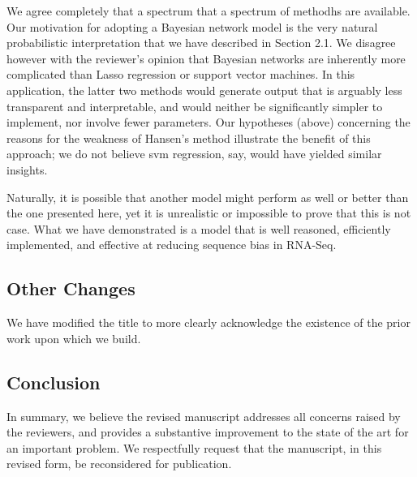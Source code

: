 \documentclass{article}
\begin{document}
We agree completely that a spectrum that a spectrum of methodhs are available.
Our motivation for adopting a Bayesian network model is the very natural
probabilistic interpretation that we have described in Section 2.1. We disagree
however with the reviewer's opinion that Bayesian networks are inherently more
complicated than Lasso regression or support vector machines.  In this
application, the latter two methods would generate output that is arguably less
transparent and interpretable, and would neither be significantly simpler to
implement, nor involve fewer parameters.  Our hypotheses (above) concerning the
reasons for the weakness of Hansen's method illustrate the benefit of this
approach; we do not believe svm regression, say, would have yielded similar
insights.

Naturally, it is possible that another model might perform as well or better
than the one presented here, yet it is unrealistic or impossible to prove that
this is not case. What we have demonstrated is a model that is well reasoned,
efficiently implemented, and effective at reducing sequence bias in RNA-Seq.


\subsection*{Other Changes}

We have modified the title to more clearly acknowledge the existence of
the prior work upon which we build.


\subsection*{Conclusion}
In summary, we believe the revised manuscript addresses all concerns
raised by the reviewers, and provides a substantive improvement to the
state of the art for an important problem.  We respectfully request
that the manuscript, in this revised form, be reconsidered for
publication.
\end{document}
